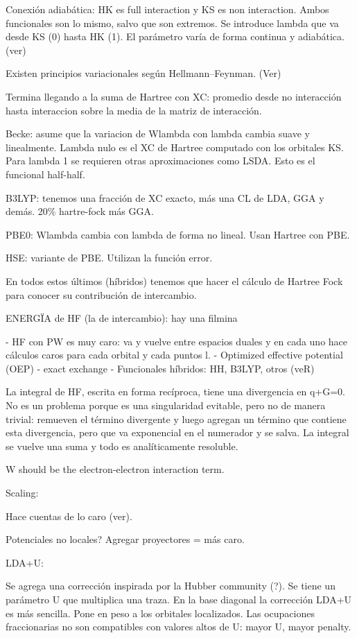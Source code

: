   Conexión adiabática: HK es full interaction y KS es non interaction. Ambos funcionales son lo mismo, salvo que son extremos. Se introduce lambda que va desde KS (0) hasta HK (1). El parámetro varía de forma continua y adiabática. (ver)

  Existen principios variacionales según Hellmann--Feynman. (Ver)

  Termina llegando a la suma de Hartree con XC: promedio desde no interacción hasta interaccion sobre la media de la matriz de interacción.

  Becke: asume que la variacion de Wlambda con lambda cambia suave y linealmente. Lambda nulo es el XC de Hartree computado con los orbitales KS. Para lambda 1 se requieren otras aproximaciones como LSDA. Esto es el funcional half-half.

  B3LYP: tenemos una fracción de XC exacto, más una CL de LDA, GGA y demás. 20\% hartre-fock más GGA.

  PBE0: Wlambda cambia con lambda de forma no lineal. Usan Hartree con PBE.

  HSE: variante de PBE. Utilizan la función error.

  En todos estos últimos (híbridos) tenemos que hacer el cálculo de Hartree Fock para conocer su contribución de intercambio.

  ENERGÏA de HF (la de intercambio): hay una filmina

  - HF con PW es muy caro: va y vuelve entre espacios duales y en cada uno hace cálculos caros para cada orbital y cada puntos l.
  - Optimized effective potential (OEP) - exact exchange
  - Funcionales híbridos: HH, B3LYP, otros (veR)

  La integral de HF, escrita en forma recíproca, tiene una divergencia en q+G=0. No es un problema porque es una singularidad evitable, pero no de manera trivial: remueven el término divergente y luego agregan un término que contiene esta divergencia, pero que va exponencial en el numerador y se salva. La integral se vuelve una suma y todo es analíticamente resoluble.

  W should be the electron-electron interaction term.

  Scaling:

  Hace cuentas de lo caro (ver).

  Potenciales no locales? Agregar proyectores = más caro.

  LDA+U:

  Se agrega una corrección inspirada por la Hubber community (?). Se tiene un parámetro U que multiplica una traza. En la base diagonal la corrección LDA+U es más sencilla. Pone en peso a los orbitales localizados. Las ocupaciones fraccionarias no son compatibles con valores altos de U: mayor U, mayor penalty.

